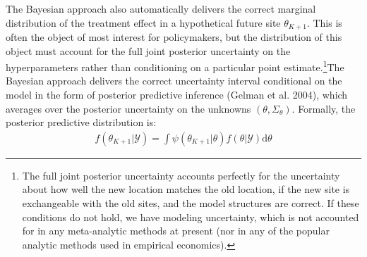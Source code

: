 \documentclass[english,12pt]{article}\usepackage{lmodern}
\numberwithin{equation}{section}
\begin{document}
The Bayesian approach also automatically delivers the correct marginal distribution of the treatment effect in a hypothetical future site $\theta_{K+1}$. This is often the object of most interest for policymakers, but the distribution of this object must account for the full joint posterior uncertainty on the hyperparameters rather than conditioning on a particular point estimate.\footnote{The full joint posterior uncertainty accounts perfectly for the uncertainty about how well the new location matches the old location, if the new site is exchangeable with the old sites, and the model structures are correct. If these conditions do not hold, we have modeling uncertainty, which is not accounted for in any meta-analytic methods at present (nor in any of the popular analytic methods used in empirical economics).}The Bayesian approach delivers the correct uncertainty interval conditional on the model in the form of posterior predictive inference (Gelman et al. 2004), which averages over the posterior uncertainty on the unknowns $(\theta, \Sigma_{\theta})$. Formally, the posterior predictive distribution is:
\begin{equation}
\begin{aligned}
f(\theta_{K+1} | \mathcal{Y}) = \int \psi(\theta_{K+1} | \theta)f(\theta | \mathcal{Y})\text{d} \theta
\end{aligned}
\label{posterior predictive}
\end{equation}
\end{document}
